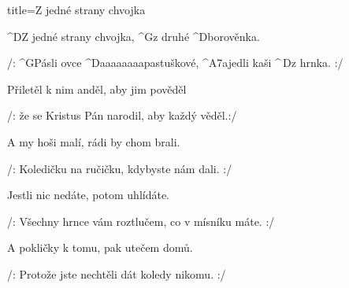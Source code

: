 \begin{song}{title=\predtitle\centering Z jedné strany chvojka \\\large   \vspace*{-0.3cm}}  %
\begin{centerjustified}
\nejnejvetsi

\sloka 
	^{D}Z jedné strany chvojka, ^{G}z druhé ^{D}borověnka.

	/: ^{G}Pásli ovce ^{D{\color{white}aaaaaaaa}}pastuškové, ^{A7{\color{white}a}}jedli kaši ^{\,D}z hrnka. :/

\sloka
	Přiletěl k nim anděl, aby jim pověděl 
	
	/: že se Kristus Pán narodil, aby každý věděl.:/

\sloka
	A my hoši malí, rádi by chom brali.
	
	/: Koledičku na ručičku, kdybyste nám dali. :/
	
\sloka
	Jestli nic nedáte, potom uhlídáte.
	
	/: Všechny hrnce vám roztlučem, co v mísníku máte. :/


\sloka
	A pokličky k tomu, pak utečem domů.
	
	/: Protože jste nechtěli dát koledy nikomu. :/

\end{centerjustified}
\setcounter{Slokočet}{0}
\end{song}

